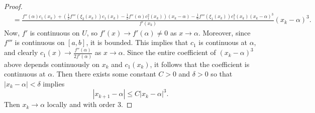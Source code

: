 \documentclass[newpage]{homework}
\begin{document}
\begin{proof}
\begin{align*}
		&= \frac{f''(\alpha)c_1(x_k) + \left(\frac{1}{2}f'''(\xi_2(x_k))c_1(x_k)-\frac{1}{2}f''(\alpha)c_1^2(x_k)\right)(x_k-\alpha) - \frac{1}{6}f'''(\xi_1(x_k))c_1^3(x_k)(x_k-\alpha)^3}{f'(x_k)}(x_k-\alpha)^3.
	\end{align*}
	Now, $f'$ is continuous on $U$, so $f'(x) \to f'(\alpha) \ne 0$ as $x \to \alpha$. Moreover, since $f'''$ is continuous on $[a,b]$, it is bounded. This implies that $c_1$ is continuous at $\alpha$, and clearly $c_1(x) \to \frac{f''(\alpha)}{2f'(\alpha)}$ as $x \to \alpha$. Since the entire coefficient of $(x_k - \alpha)^3$ above depends continuously on $x_k$ and $c_1(x_k)$, it follows that the coefficient is continuous at $\alpha$. Then there exists some constant $C > 0$ and $\delta > 0$ so that $|x_k - \alpha| < \delta$ implies
	\begin{equation*}
		|x_{k+1} - \alpha| \le C|x_k - \alpha|^3.
	\end{equation*}
	Then $x_k \to \alpha$ locally and with order 3.
\end{proof}
\end{document}
